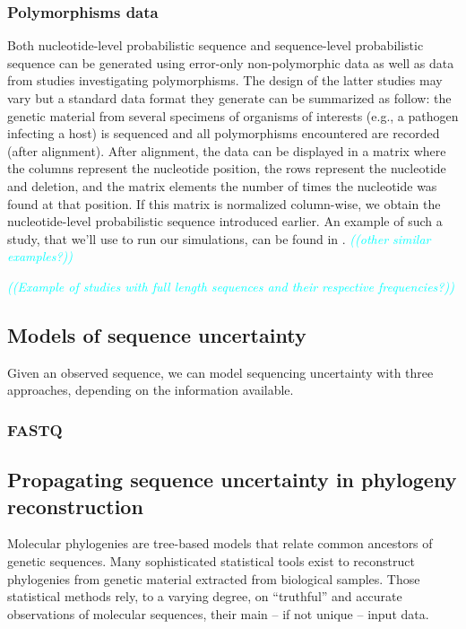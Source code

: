 \documentclass[10pt]{article}
\newcommand{\comment}[1]{\textsl{\textcolor{cyan}{((#1))}}}
\newcommand{\nlps}{nucleotide-level probabilistic sequence\xspace}
\newcommand{\slps}{sequence-level probabilistic sequence\xspace}
\begin{document}
\subsubsection{Polymorphisms data}
Both \nlps and \slps can be generated using error-only non-polymorphic data as well as data from studies investigating polymorphisms.
The design of the latter studies may vary but a standard data format they generate can be summarized as follow: the genetic material from several specimens of organisms of interests (e.g., a pathogen infecting a host) is sequenced and all polymorphisms encountered are recorded (after alignment). 
After alignment, the data can be displayed in a matrix where the columns represent the nucleotide position, the rows represent the nucleotide and deletion, and the matrix elements the number of times the nucleotide was found at that position.
If this matrix is normalized column-wise, we obtain the \nlps introduced earlier. 
An example of such a study, that we'll use to run our simulations, can be found in \cite{Zanini:2015}. \comment{other similar examples?}

\comment{Example of studies with full length sequences and their respective frequencies?}



\subsection{Models of sequence uncertainty}

Given an observed sequence, we can model sequencing uncertainty with three approaches, depending on the information available. 

\subsubsection{FASTQ}




\subsection{Propagating sequence uncertainty in phylogeny reconstruction}

Molecular phylogenies are tree-based models that relate common ancestors of genetic sequences. Many sophisticated statistical tools exist to reconstruct phylogenies from genetic material extracted from biological samples. Those statistical methods rely, to a varying degree, on ``truthful'' and accurate observations of molecular sequences, their main -- if not unique -- input data.
\end{document}
